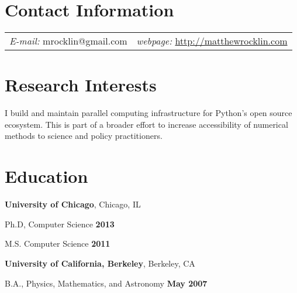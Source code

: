 \documentclass[margin,line]{res}
\newenvironment{list1}{
  \begin{list}{\ding{113}}{%
      \setlength{\itemsep}{0in}
      \setlength{\parsep}{0in} \setlength{\parskip}{0in}
      \setlength{\topsep}{0in} \setlength{\partopsep}{0in}
      \setlength{\leftmargin}{0.17in}}}{\end{list}}
\begin{document}
\newcommand{\link}[1]{\texttt{#1}}
\providecommand{\tightlist}{%
      \setlength{\itemsep}{0pt}\setlength{\parskip}{0pt}}



\begin{resume}
\section{\sc Contact Information}
\vspace{.05in}
\begin{tabular}{@{}p{2in}p{4in}}
{\it E-mail:}  mrocklin@gmail.com   & {\it webpage:} \href{http://matthewrocklin.com}{http://matthewrocklin.com} \\
\end{tabular}


\section{\sc Research Interests}

I build and maintain parallel computing infrastructure for Python's open source ecosystem.
This is part of a broader effort to increase accessibility of numerical methods to science and policy practitioners.

\section{\sc Education}
{\bf University of Chicago}, Chicago, IL\\
\vspace*{-.1in}
\begin{list1}
\item[] Ph.D, Computer Science \hfill {\bf 2013}
\item[] M.S. Computer Science \hfill {\bf 2011}
\end{list1}

{\bf University of California, Berkeley}, Berkeley, CA\\
\vspace*{-.1in}
\begin{list1}
\item[] B.A., Physics, Mathematics, and Astronomy \hfill {\bf May 2007}
\end{list1}


\end{resume}
\end{document}
